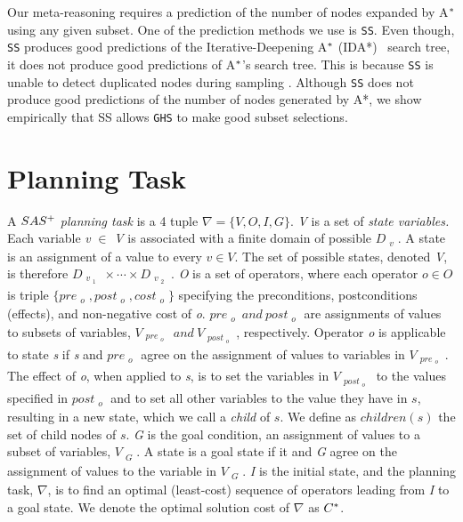 Our meta-reasoning requires a prediction of the number of nodes expanded by A$\sp{*}$ using any given subset. One of the prediction methods we use is \texttt{SS}. Even though, \texttt{SS} produces good predictions of the Iterative-Deepening A$\sp{*}$ (IDA*)~\cite{Korf85ida} search tree, it does not produce good predictions of A$\sp{*}$'s search tree. This is because \texttt{SS} is unable to detect duplicated nodes during sampling \cite{lelis2014estimating}. Although \texttt{SS} does not produce good predictions of the number of nodes generated by A*, we show empirically that SS allows \texttt{GHS} to make good subset selections.

\section{Planning Task}

A $SAS\sp{+}$ \emph{planning task} \cite{backstrom1995complexity} is a 4 tuple $\nabla = \{V, O, I, G\}.$ \textit{V} is a set of \textit{state variables.} Each variable \textit{v} $\in$ \textit{V} is associated with a finite domain of possible $D_{\substack{v}}$. A state is an assignment of a value to every $v \in V.$ The set of possible states, denoted \textit{V}, is therefore $D_{\substack{v_{\substack{1}}}}    \times \cdots \times D_{\substack{v_{\substack{2}}}}$. \textit{O} is a set of operators, where each operator $o \in O$ is triple $\{pre_{\substack{o}} , post_{\substack{o}}, cost_{\substack{o}}\}$ specifying the preconditions, postconditions (effects), and non-negative cost of \textit{o}. $pre_{\substack{o}}\ and\ post_{\substack{o}}$ are assignments of values to subsets of variables, $V_{\substack{pre_{\substack{o}}}}\ and\ V_{\substack{post_{\substack{o}}}}$, respectively. Operator \textit{o} is applicable to state \textit{s} if \textit{s} and $pre_{\substack{o}}$ agree on the assignment of values to variables in $V_{\substack{pre_{\substack{o}}}}$. The effect of \textit{o}, when applied to \textit{s}, is to set the variables in $V_{\substack{post_{\substack{o}}}}$ to the values specified in $post_{\substack{o}}$ and to set all other variables to the value they have in $s$, resulting in a new state, which we call a \emph{child} of $s$. We define as $children(s)$ the set of child nodes of $s$. \textit{G} is the goal condition, an assignment of values to a subset of variables, $V_{\substack{G}}$. A state is a goal state if it and \textit{G} agree on the assignment of values to the variable in $V_{\substack{G}}$. \textit{I} is the initial state, and the planning task, $\nabla$, is to find an optimal (least-cost) sequence of operators leading from \textit{I} to a goal state. We denote the optimal solution cost of $\nabla$ as $C\sp{*}$. 

